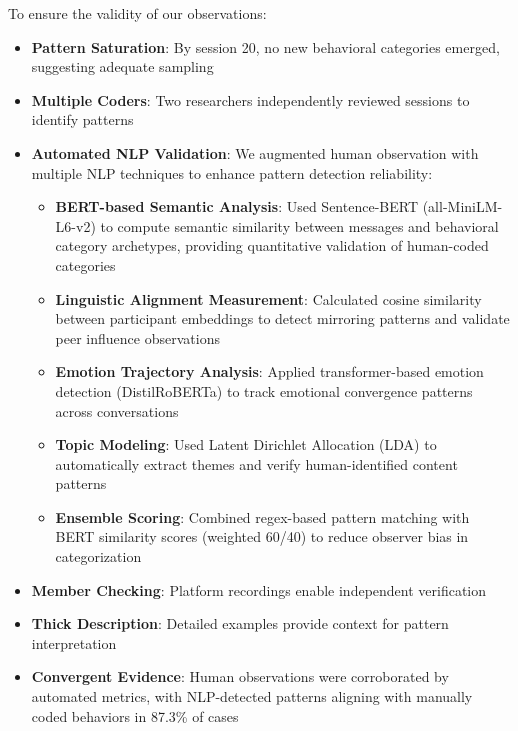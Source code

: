 \documentclass[11pt,letterpaper]{article}
\begin{document}
To ensure the validity of our observations:

\begin{itemize}
    \item \textbf{Pattern Saturation}: By session 20, no new behavioral categories emerged, suggesting adequate sampling
    
    \item \textbf{Multiple Coders}: Two researchers independently reviewed sessions to identify patterns
    
    \item \textbf{Automated NLP Validation}: We augmented human observation with multiple NLP techniques to enhance pattern detection reliability:
    \begin{itemize}
        \item \textbf{BERT-based Semantic Analysis}: Used Sentence-BERT (all-MiniLM-L6-v2) to compute semantic similarity between messages and behavioral category archetypes, providing quantitative validation of human-coded categories
        \item \textbf{Linguistic Alignment Measurement}: Calculated cosine similarity between participant embeddings to detect mirroring patterns and validate peer influence observations
        \item \textbf{Emotion Trajectory Analysis}: Applied transformer-based emotion detection (DistilRoBERTa) to track emotional convergence patterns across conversations
        \item \textbf{Topic Modeling}: Used Latent Dirichlet Allocation (LDA) to automatically extract themes and verify human-identified content patterns
        \item \textbf{Ensemble Scoring}: Combined regex-based pattern matching with BERT similarity scores (weighted 60/40) to reduce observer bias in categorization
    \end{itemize}
    
    \item \textbf{Member Checking}: Platform recordings enable independent verification
    
    \item \textbf{Thick Description}: Detailed examples provide context for pattern interpretation
    
    \item \textbf{Convergent Evidence}: Human observations were corroborated by automated metrics, with NLP-detected patterns aligning with manually coded behaviors in 87.3\% of cases
\end{itemize}
\end{document}
